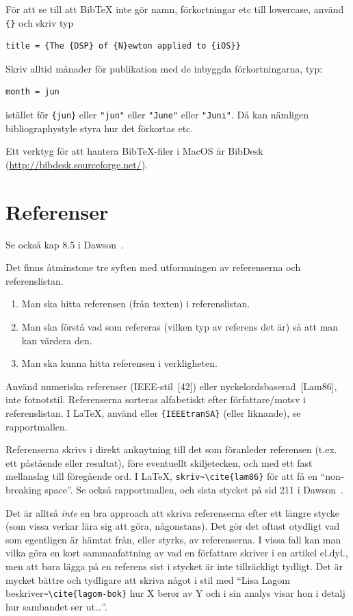 \documentclass[a4paper,12pt]{article}
\begin{document}
För att se till att BibTeX inte gör namn, förkortningar etc till lowercase, använd \verb|{}| och skriv typ
\begin{verbatim}
title = {The {DSP} of {N}ewton applied to {iOS}}
\end{verbatim}

Skriv alltid månader för publikation med de inbyggda förkortningarna, typ:
\begin{verbatim}
month = jun
\end{verbatim}
istället för \verb|{jun}| eller \verb|"jun"| eller \verb|"June"| eller \verb|"Juni"|. Då kan nämligen bibliographystyle styra hur det förkortas etc.

Ett verktyg för att hantera BibTeX-filer i MacOS är BibDesk (\url{http://bibdesk.sourceforge.net/}).


\section{Referenser}
\label{sec:referenser}

Se också kap 8.5 i Dawson~\cite{dawson:projects-in-computing}.

Det finns åtminstone tre syften med utformningen av referenserna och referenslistan.
\begin{enumerate}
\item Man ska hitta referensen (från texten) i referenslistan.
\item Man ska förstå vad som refereras (vilken typ av referens det är) så att man kan värdera den.
\item Man ska kunna hitta referensen i verkligheten.
\end{enumerate}

Använd numeriska referenser (IEEE-stil~[42]) eller nyckelordsbaserad~[Lam86], inte fotnotstil. Referenserna sorteras alfabetiskt efter författare/motsv i referenslistan. I LaTeX, använd \verb|| eller \verb|{IEEEtranSA}| (eller liknande), se rapportmallen.

Referenserna skrivs i direkt anknytning till det som föranleder referensen (t.ex. ett påstående eller resultat), före eventuellt skiljetecken, och med ett fast mellanslag till föregående ord. I LaTeX, \verb|skriv~\cite{lam86}| för att få en ``non-breaking space''. Se också rapportmallen, och sista stycket på sid 211 i Dawson~\cite{dawson:projects-in-computing}.

Det är alltså \emph{inte} en bra approach att skriva referenserna efter ett längre stycke (som vissa verkar lära sig att göra, någonstans). Det gör det oftast otydligt vad som egentligen är hämtat från, eller styrks, av referenserna. I vissa fall kan man vilka göra en kort sammanfattning av vad en författare skriver i en artikel el.dyl., men att bara lägga på en referens sist i stycket är inte tillräckligt tydligt. Det är mycket bättre och tydligare att skriva något i stil med ``Lisa Lagom beskriver\verb|~\cite{lagom-bok}| hur X beror av Y och i sin analys visar hon i detalj hur sambandet ser ut\ldots''.
\end{document}
